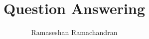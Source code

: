 


\title{Question Answering}
\author[]{Ramaseshan Ramachandran}
\date{}
	\maketitle
%	
%	
	
    
%    
    
%	
%	

    
